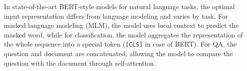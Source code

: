 In state-of-the-art BERT-style models for natural language tasks, the optimal input representation differs from language modeling and varies by task.
For masked language modeling (MLM), the model uses local context to predict the masked word, while for classification, the model aggregates the representation of the whole sequence into a special token (\texttt{[CLS]} in case of BERT).
For QA, the question and document are concatenated, allowing the model to compare the question with the document through self-attention.


